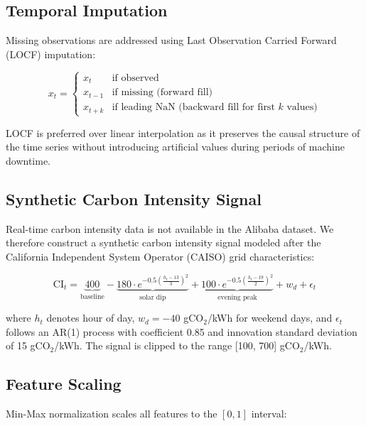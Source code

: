\documentclass[12pt]{report}
\begin{document}
\subsection{Temporal Imputation}

Missing observations are addressed using Last Observation Carried Forward (LOCF) imputation:

\begin{equation}
x_t = \begin{cases}
x_t & \text{if observed} \\
x_{t-1} & \text{if missing (forward fill)} \\
x_{t+k} & \text{if leading NaN (backward fill for first } k \text{ values)}
\end{cases}
\end{equation}

LOCF is preferred over linear interpolation as it preserves the causal structure of the time series without introducing artificial values during periods of machine downtime.

\subsection{Synthetic Carbon Intensity Signal}

Real-time carbon intensity data is not available in the Alibaba dataset. We therefore construct a synthetic carbon intensity signal modeled after the California Independent System Operator (CAISO) grid characteristics:

\begin{equation}
\text{CI}_t = \underbrace{400}_{\text{baseline}} - \underbrace{180 \cdot e^{-0.5 \left(\frac{h_t - 13}{3}\right)^2}}_{\text{solar dip}} + \underbrace{100 \cdot e^{-0.5 \left(\frac{h_t - 19}{2}\right)^2}}_{\text{evening peak}} + w_d + \epsilon_t
\end{equation}

where $h_t$ denotes hour of day, $w_d = -40$ gCO$_2$/kWh for weekend days, and $\epsilon_t$ follows an AR(1) process with coefficient 0.85 and innovation standard deviation of 15 gCO$_2$/kWh. The signal is clipped to the range [100, 700] gCO$_2$/kWh.

\subsection{Feature Scaling}

Min-Max normalization scales all features to the $[0, 1]$ interval:
\end{document}
